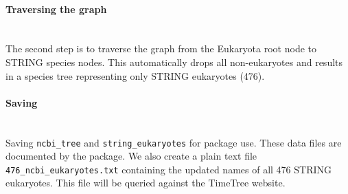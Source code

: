 \hypertarget{traversing-the-graph}{%
\paragraph{\texorpdfstring{\textbf{Traversing the
graph}}{Traversing the graph}}\label{traversing-the-graph}}

\texttt{}\\
The second step is to traverse the graph from the Eukaryota root node to
STRING species nodes. This automatically drops all non-eukaryotes and
results in a species tree representing only STRING eukaryotes (476).

\begin{Shaded}
\end{Shaded}

\hypertarget{saving}{%
\paragraph{\texorpdfstring{\textbf{Saving}}{Saving}}\label{saving}}

\texttt{}\\
Saving \texttt{ncbi\_tree} and \texttt{string\_eukaryotes} for package
use. These data files are documented by the package. We also create a
plain text file \texttt{476\_ncbi\_eukaryotes.txt} containing the
updated names of all 476 STRING eukaryotes. This file will be queried
against the TimeTree website.


